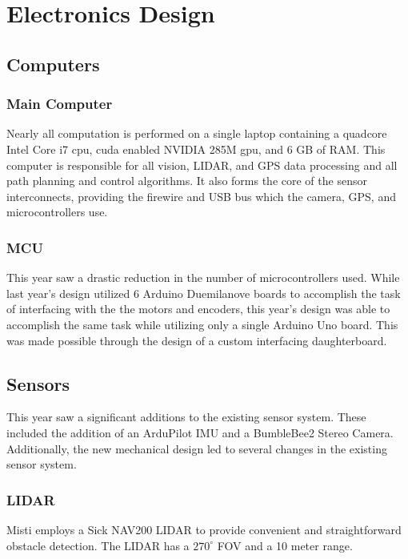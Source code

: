 \section{Electronics Design}

\subsection{Computers}

\subsubsection{Main Computer}

Nearly all computation is performed on a single laptop containing a quadcore Intel Core i7 cpu,
cuda enabled NVIDIA 285M gpu, and 6 GB of RAM. This computer is responsible for all vision,
LIDAR, and GPS data processing and all path planning and control algorithms. It also forms 
the core of the sensor interconnects, providing the firewire and USB bus which the camera, GPS, and
microcontrollers use.

\subsubsection{MCU}

This year saw a drastic reduction in the number of microcontrollers used. While last year's design utilized 6 Arduino Duemilanove boards to accomplish the task of interfacing with the the motors and encoders, this year's design was able to accomplish the same task while utilizing only a single Arduino Uno board. This was made possible through the design of a custom interfacing daughterboard.

\subsection{Sensors}

This year saw a significant additions to the existing sensor system. These included the addition of an ArduPilot IMU and a BumbleBee2 Stereo Camera. Additionally, the new mechanical design led to several changes in the existing sensor system.
\subsubsection{LIDAR}

Misti employs a Sick NAV200 LIDAR to provide convenient and straightforward obstacle detection. The LIDAR has a $270^{\circ}$ FOV and a 10 meter range.

